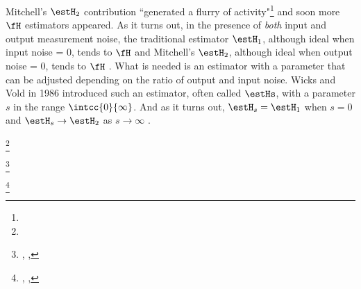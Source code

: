 Mitchell's $\estH_2$ contribution ``generated a flurry of activity"\footnote{}
and soon more $\fH$ estimators appeared. 
As it turns out, in the presence of \emph{both} input and output measurement noise,
the traditional estimator $\estH_1$, although ideal when input noise = 0, tends to  $\fH$ and 
Mitchell's $\estH_2$, although ideal when output noise = 0, 
tends to  $\fH$ .
What is needed is an estimator with a parameter that can be adjusted 
depending on the ratio of output and input noise.
Wicks and Vold in 1986 introduced such an estimator, often called $\estHs$, with a
parameter $s$ in the range $\intcc{0}{\infty}$.
And as it turns out, $\estH_s = \estH_1$ when $s=0$ and 
$\estH_s\to\estH_2$ as $s\to\infty$ .
\begin{definition}
\footnote{
  }
\label{def:Hs}
\end{definition}


\begin{definition}
\footnote{
  ,
  ,
  }
\label{def:Hw}
\end{definition}

\begin{definition}
\footnote{
  ,
  ,
  }
\label{def:Hw}
\end{definition}

